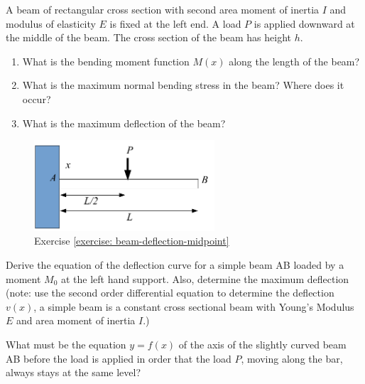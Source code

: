 \documentclass[
fontsize=10pt,
a4paper,
twosides=false,
open=any,
svgnames,
]{kaobook} %
\begin{document}
\begin{exercises}
  
  \item \label{exercise: beam-deflection-midpoint} A beam of rectangular cross section with second area moment of inertia $I$ and modulus of elasticity $E$ is fixed at the left end. A load $P$ is applied downward at the middle of the beam. The cross section of the beam has height $h$.
  \begin{enumerate}
  \item What is the bending moment function $M(x)$ along the length of the beam?
  \item What is the maximum normal bending stress in the beam? Where does it occur?
  \item What is the maximum deflection of the beam?
  \end{enumerate}

  \begin{figure}[H]
    \centering
    \includegraphics[width=0.6\textwidth]{pictures/Static-body-load-analysis/beam-def-midpoint-exercise}
    \caption{Exercise \ref{exercise: beam-deflection-midpoint}}
  \end{figure}
  
  \item Derive the equation of the deflection curve for a simple beam AB loaded by a moment $M_0$ at the left hand support. Also, determine the maximum deflection  (note: use the second order differential equation to determine the deflection $v(x)$, a simple beam is a constant cross sectional beam with Young’s Modulus $E$ and area moment of inertia $I$.)

  \item \label{exercise: beam-deflection-moving-force} What must be the equation $y = f(x)$ of the axis of the slightly curved beam AB before the load is applied in order that the load $P$, moving along the bar, always stays at the same level?


\end{exercises}
\end{document}
